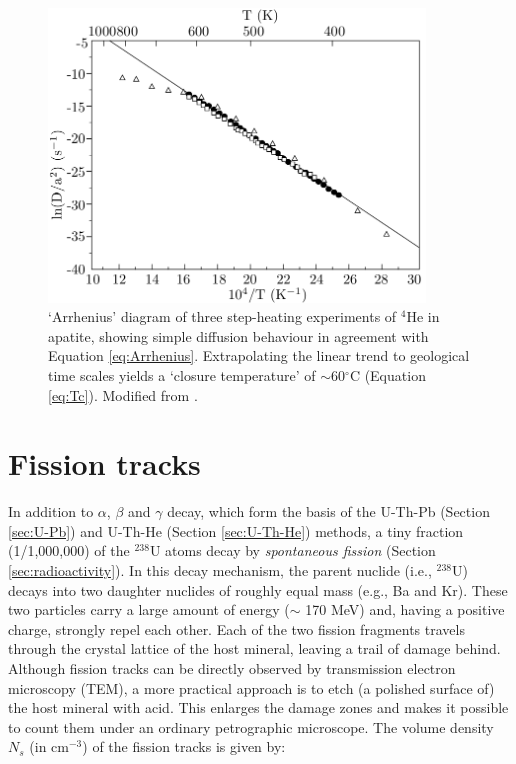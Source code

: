 \documentclass{book}
\newif\ifpdf
\begin{document}
\begin{figure}[!ht]
  \centering
  \ifpdf
  \def\svgwidth{.85\textwidth}
  
  \else
  \includegraphics[width=10cm]{Arrhenius.png}
  \fi
  \caption{`Arrhenius' diagram of three step-heating experiments of
    $^4$He in apatite, showing simple diffusion behaviour in agreement
    with Equation \ref{eq:Arrhenius}. Extrapolating the linear trend
    to geological time scales yields a `closure temperature' of
    $\sim$60$^\circ$C (Equation \ref{eq:Tc}). Modified from
    \citet{braun2006}.}
  \label{fig:Arrhenius}
\end{figure}

\section{Fission tracks}
\label{sec:fission-tracks}

In addition to $\alpha$, $\beta$ and $\gamma$ decay, which form the
basis of the U-Th-Pb (Section \ref{sec:U-Pb}) and U-Th-He (Section
\ref{sec:U-Th-He}) methods, a tiny fraction (1/1,000,000) of the
$^{238}$U atoms decay by \emph{spontaneous fission} (Section
\ref{sec:radioactivity}). In this decay mechanism, the parent nuclide
(i.e., $^{238}$U) decays into two daughter nuclides of roughly equal
mass (e.g., Ba and Kr). These two particles carry a large amount of
energy ($\sim$ 170 MeV) and, having a positive charge, strongly repel
each other. Each of the two fission fragments travels through the
crystal lattice of the host mineral, leaving a trail of damage
behind. Although fission tracks can be directly observed by
transmission electron microscopy (TEM), a more practical approach is
to etch (a polished surface of) the host mineral with acid. This
enlarges the damage zones and makes it possible to count them under an
ordinary petrographic microscope. The volume density $N_s$ (in
cm$^{-3}$) of the fission tracks is given by:
\end{document}

